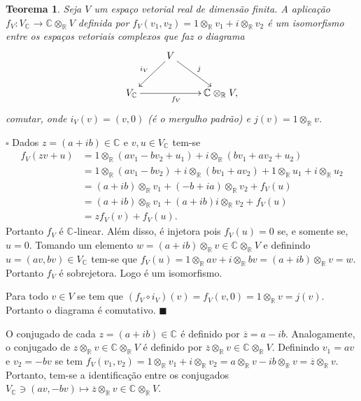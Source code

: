 \documentclass[12pt]{book}
\newtheorem{teorema}{Teorema}[section]
\newenvironment{prova}[1]{$\square$ #1}{\hfill$\blacksquare$}
\newcommand{\complexificacao}[1]{#1_{\complexo{}}}
\newcommand{\complexificacaotensorial}[1]{\complexo{}\otimes_{\reta} #1}
\newcommand{\complexificacaoelemento}[2]{#1\otimes_{\reta} #2}
\newcommand{\complexo}[1]{\mathbb{C}^{#1}}
\newcommand{\real}[1]{\mathbb{R}^{#1}}
\newcommand{\reta}{\real{}}
\begin{document}
	\begin{teorema}\label{teorema_isomorfismo_complexificacao}
		Seja $V$ um espaço vetorial real de dimensão finita. A aplicação $f_{V}: \complexificacao{V} \to \complexificacaotensorial{V}$ definida por  $f_{V}(v_{1},v_{2}) = 1\otimes_{\reta} v_{1} + i \otimes_{\reta} v_{2}$ é um isomorfismo entre os espaços vetoriais complexos que faz o diagrama
		$$
		\xymatrix{
			& V\ar[dl]_{i_{V}}\ar[rd]^{j} &
			\\
			\complexificacao{V}\ar[rr]_{f_{V}}& & \complexificacaotensorial{V},
		}
		$$
		comutar, onde $i_{V}(v) = (v,0)$ (é o mergulho padrão) e $j(v) = 1\otimes_{\reta} v$.
	\end{teorema}
	\begin{prova}
		Dados $z=(a+ib) \in \complexo{}$ e $v,u \in \complexificacao{V}$ tem-se
		$$
		\begin{aligned}
		f_{V}(zv+u) &= 1\otimes_{\reta} (a v_{1} - bv_{2} + u_{1}) + i \otimes_{\reta} (bv_{1}+av_{2} + u_{2})
		\\
		&=1\otimes_{\reta} (a v_{1} - bv_{2}) + i \otimes_{\reta} (bv_{1}+av_{2})+1\otimes_{\reta} u_{1} + i \otimes_{\reta} u_{2}
		\\
		&=(a+ib)\otimes_{\reta}v_{1} + (-b+ia)\otimes_{\reta} v_{2}+f_{V}(u)
		\\
		&=(a+ib)\otimes_{\reta}v_{1} + (a+ib)i\otimes_{\reta} v_{2}+f_{V}(u)
		\\
		&=zf_{V}(v)+f_{V}(u).
		\end{aligned}
		$$
		Portanto $f_{V}$ é $\complexo{}$-linear. Além disso, é injetora pois $f_{V}(u) = 0$ se, e somente se, $u = 0$. Tomando um elemento $w = (a+ib)\otimes_{\reta}v \in \complexificacaotensorial{V} $ e definindo $u = (av, bv) \in \complexificacao{V}$ tem-se que $f_{V}(u) = \complexificacaoelemento{1}{av} +\complexificacaoelemento{i}{bv} = (a+ib)\otimes_{\reta} v = w$. Portanto $f_{V}$ é sobrejetora. Logo é um isomorfismo.
		
		Para todo $v \in V$ se tem que $(f_{V}\circ i_{V})(v) = f_{V}(v, 0) = 1\otimes_{\reta} v = j(v)$. Portanto o diagrama é comutativo.
	\end{prova}
	
	O conjugado de cada $z=(a+ib) \in \complexo{}$ é definido por $\overline{z} = a-ib$. Analogamente, o conjugado de $\complexificacaoelemento{z}{v} \in \complexificacaotensorial{V}$ é definido por $\complexificacaoelemento{\overline{z}}{v} \in \complexificacaotensorial{V}$. Definindo $v_{1} =av$ e $v_{2} = -bv$ se tem $f_{V}(v_{1}, v_{2}) =\complexificacaoelemento{1}{v_{1}} +\complexificacaoelemento{i}{v_{2}} = \complexificacaoelemento{a}{v} -\complexificacaoelemento{ib}{v}  =\complexificacaoelemento{\overline{z}}{v}  $. Portanto, tem-se a identificação entre os conjugados $ \complexificacao{V} \ni (av, -bv) \mapsto \complexificacaoelemento{\overline{z}}{v} \in \complexificacaotensorial{V}$.
	
\end{document}

